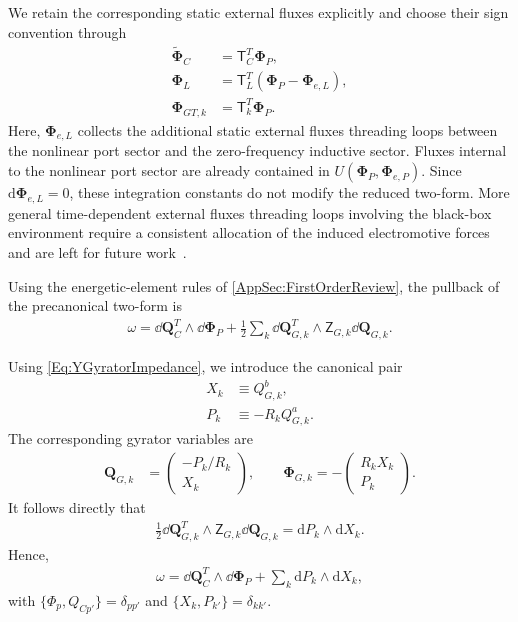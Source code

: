 \documentclass[prx,aps,twocolumn,article]{revtex4-2}
\newcommand{\msf}[1]{\mathsf{#1}}
\newcommand{\bsb}[1]{\boldsymbol{#1}}
\newcommand{\bPhi}{\bsb{\Phi}}
\newcommand{\bQ}{\bsb{Q}}
\newcommand{\dbQ}{\dd\bQ}
\newcommand{\dbPhi}{\dd\bPhi}
\newcommand{\msT}{\msf{T}}
\newcommand{\msZ}{\msf{Z}}
\begin{document}
We retain the corresponding static external fluxes explicitly and choose their sign convention through
\begin{align}
    \tilde{\bPhi}_C
    &=
    \msT_C^T\bPhi_P,
    \nonumber\\
    \bPhi_L
    &=
    \msT_L^T
    \left(
        \bPhi_P-\bPhi_{e,L}
    \right),
    \nonumber\\
    \bPhi_{GT,k}
    &=
    \msT_k^T\bPhi_P.
    \label{Eq:YIntegratedFluxConstraints}
\end{align}
Here, $\bPhi_{e,L}$ collects the additional static external fluxes threading loops between the nonlinear port sector and the zero-frequency inductive sector. Fluxes internal to the nonlinear port sector are already contained in $U(\bPhi_P,\bPhi_{e,P})$. Since $\mathrm{d}\bPhi_{e,L}=0$, these integration constants do not modify the reduced two-form. More general time-dependent external fluxes threading loops involving the black-box environment require a consistent allocation of the induced electromotive forces and are left for future work~\cite{Riwar:2022}.

Using the energetic-element rules of
\cref{AppSec:FirstOrderReview}, the pullback of the precanonical
two-form is
\begin{align}
    \omega
    =
    \dbQ_C^T
    \wedge
    \dbPhi_P
    +
    \frac{1}{2}
    \sum_k
    \dbQ_{G,k}^T
    \wedge
    \msZ_{G,k}
    \dbQ_{G,k}.
    \label{Eq:TwoFormFinalYShort}
\end{align}

Using \cref{Eq:YGyratorImpedance}, we introduce the canonical pair
\begin{align}
    X_k
    &\equiv
    Q_{G,k}^{b},
    \nonumber\\
    P_k
    &\equiv
    -R_kQ_{G,k}^{a}.
    \label{Eq:YGyratorCanonicalVariables}
\end{align}
The corresponding gyrator variables are
\begin{align}
    \bQ_{G,k}
    &=
    \begin{pmatrix}
        -P_k/R_k\\
        X_k
    \end{pmatrix},
    \qquad
    \bPhi_{G,k}
    =
    -
    \begin{pmatrix}
        R_kX_k\\
        P_k
    \end{pmatrix}.
    \label{Eq:YGyratorCanonicalVectors}
\end{align}
It follows directly that
\begin{align}
    \frac{1}{2}
    \dbQ_{G,k}^T
    \wedge
    \msZ_{G,k}
    \dbQ_{G,k}
    =
    \mathrm{d}P_k
    \wedge
    \mathrm{d}X_k.
\end{align}
Hence,
\begin{align}
    \omega
    =
    \dbQ_C^T
    \wedge
    \dbPhi_P
    +
    \sum_k
    \mathrm{d}P_k
    \wedge
    \mathrm{d}X_k,
\end{align}
with
$\{\Phi_p,Q_{Cp'}\}=\delta_{pp'}$ and
$\{X_k,P_{k'}\}=\delta_{kk'}$.
\end{document}
